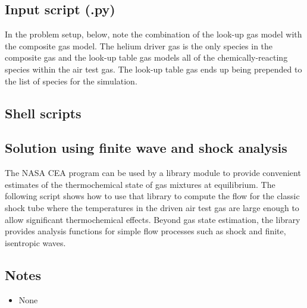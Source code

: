 \newpage
\subsection{Input script (.py)}
\label{cst-py-file}
%
In the problem setup, below, note the combination of the look-up gas model with the composite gas model.
The helium driver gas is the only species in the composite gas and the look-up table gas models
all of the chemically-reacting species within the air test gas.
The look-up table gas ends up being prepended to the list of species for the simulation.

\noindent
\topbar

\bottombar

\newpage
\subsection{Shell scripts}
\label{cst-sh-files}
\topbar

\bottombar

\noindent
\topbar

\bottombar

\noindent
\topbar

\bottombar

\newpage
\subsection{Solution using finite wave and shock analysis}
%
The NASA CEA program can be used by a library module to provide convenient estimates 
of the thermochemical state of gas mixtures at equilibrium.
The following script shows how to use that library to compute the flow for the classic
shock tube where the temperatures in the driven air test gas are large enough to 
allow significant thermochemical effects.
Beyond gas state estimation, the library provides analysis functions for simple 
flow processes such as shock and finite, isentropic waves.

\noindent
\topbar

\bottombar

\subsection{Notes}
\begin{itemize}
\item None
\end{itemize}
